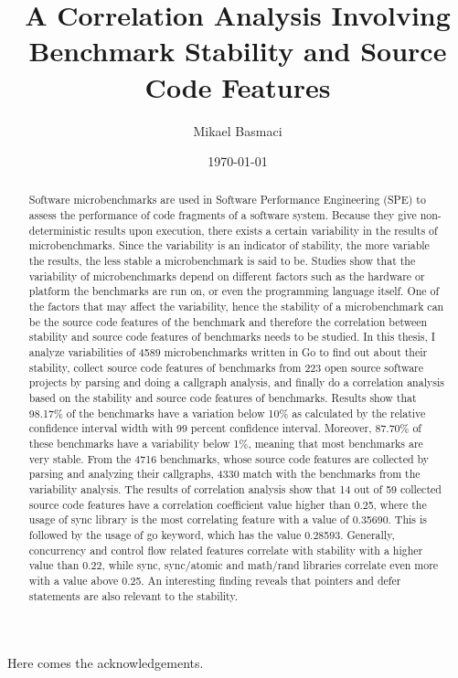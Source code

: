 \documentclass{seal_thesis}
\date{\today}
\title{A Correlation Analysis Involving Benchmark Stability and Source Code Features}
\author{Mikael Basmaci}
\begin{document}
\maketitle

\frontmatter

\begin{acknowledgements}
	Here comes the acknowledgements.
\end{acknowledgements}

\begin{abstract}
		
Software microbenchmarks are used in Software Performance Engineering (SPE) to assess the performance of code fragments of a software system. Because they give non-deterministic results upon execution, there exists a certain variability in the results of microbenchmarks. Since the variability is an indicator of stability, the more variable the results, the less stable a microbenchmark is said to be. Studies show that the variability of microbenchmarks depend on different factors such as the hardware or platform the benchmarks are run on, or even the programming language itself. One of the factors that may affect the variability, hence the stability of a microbenchmark can be the source code features of the benchmark and therefore the correlation between stability and source code features of benchmarks needs to be studied. In this thesis, I analyze variabilities of 4589 microbenchmarks written in Go to find out about their stability, collect source code features of benchmarks from 223 open source software projects by parsing and doing a callgraph analysis, and finally do a correlation analysis based on the stability and source code features of benchmarks. Results show that 98.17\% of the benchmarks have a variation below 10\% as calculated by the relative confidence interval width with 99 percent confidence interval. Moreover, 87.70\% of these benchmarks have a variability below 1\%, meaning that most benchmarks are very stable. From the 4716 benchmarks, whose source code features are collected by parsing and analyzing their callgraphs, 4330 match with the benchmarks from the variability analysis. The results of correlation analysis show that 14 out of 59 collected source code features have a correlation coefficient value higher than 0.25, where the usage of sync library is the most correlating feature with a value of 0.35690. This is followed by the usage of go keyword, which has the value 0.28593. Generally, concurrency and control flow related features correlate with stability with a higher value than 0.22, while sync, sync/atomic and math/rand libraries correlate even more with a value above 0.25. An interesting finding reveals that pointers and defer statements are also relevant to the stability.


\end{abstract}
\end{document}

